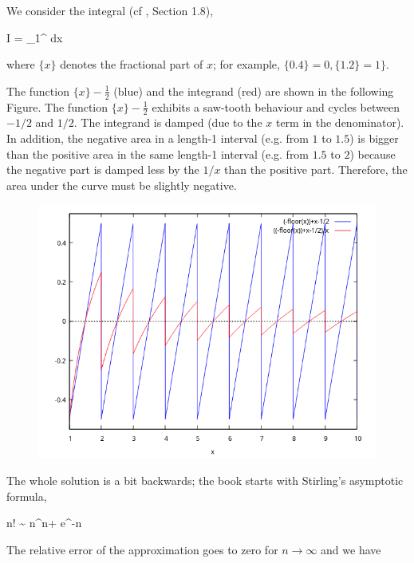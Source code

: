 
We consider the integral (cf \cite{nahin2020inside}, Section 1.8),

\bee
I = \int_1^\infty {} dx
\eee

where $\{x\}$ denotes the fractional part of $x$; for example, $\{0.4\} = 0, \{1.2\} = 1\}$.

The function $\{x\} - \frac{1}{2}$ (blue) and the integrand (red) are shown in the following Figure. The function $\{x\} - \frac{1}{2}$ exhibits a saw-tooth behaviour and cycles between $-1/2$ and $1/2$. The integrand is damped (due to the $x$ term in the denominator). In addition, the negative area in a length-1 interval (e.g. from $1$ to $1.5$) is bigger than the positive area in the same length-1 interval (e.g. from $1.5$ to $2$) because the negative part is damped less by the $1/x$ than the positive part. Therefore, the area under the curve must be slightly negative.

\begin{figure}[H]
\includegraphics[scale=0.7]{images/2022-03-15_plot_1.png}
\end{figure}

The whole solution is a bit backwards; the book starts with Stirling's asymptotic formula,

\bee
n! \sim \sqrt{2\pi} n^{n+} e^{-n}
\eee

The relative error of the approximation goes to zero for $n \rightarrow \infty$ and we have

